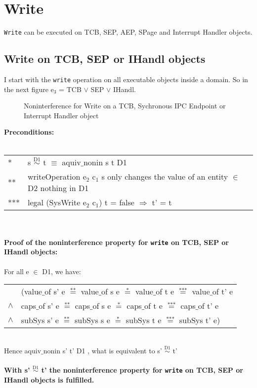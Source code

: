 \section{Write}\label{Write}
\texttt{Write} can be executed on TCB, SEP, AEP, SPage and Interrupt Handler objects.
\subsection{Write on TCB, SEP or IHandl objects}
I start with the \texttt{write} operation on all executable objects inside a domain. So in the next figure e$_3$ = TCB $\vee$ SEP $\vee$ IHandl.
\begin{figure}[H]
\caption{Noninterference for Write on a TCB, Sychronous IPC Endpoint or Interrupt Handler object}
\end{figure}
\textbf{Preconditions:} \\ \\
\begin{tabular}{ll}
* & s $\overset{\text{D1}}{\sim}$ t $\equiv$ aquiv$\_$nonin s t D1	\\ 
** & writeOperation e$_2$ c$_1$ s only changes the value of an entity $\in$ D2 nothing in D1 \\ 
*** & legal (SysWrite e$_2$ c$_1$) t = false $\Rightarrow$ t' = t
\end{tabular} \\ \\ 
\textbf{Proof of the noninterference property for \texttt{write} on TCB, SEP or IHandl objects:}\\ \\
For all e $\in$ D1, we have: \\ 
\begin{tabular}{ll}
& (value$\_$of s' e $\overset{\text{**}}{=}$ value$\_$of s e $\overset{\text{*}}{=}$ value$\_$of t e $\overset{\text{***}}{=}$ value$\_$of t' e \\
$\wedge$ & caps$\_$of s' e $\overset{\text{**}}{=}$ caps$\_$of s e $\overset{\text{*}}{=}$ caps$\_$of t e $\overset{\text{***}}{=}$ caps$\_$of t' e \\
$\wedge$ & subSys s' e $\overset{\text{**}}{=}$ subSys s e $\overset{\text{*}}{=}$ subSys t e $\overset{\text{***}}{=}$ subSys t' e)
\end{tabular} \\
Hence aquiv$\_$nonin s' t' D1 , what is equivalent to s' $\overset{\text{D1}}{\sim}$ t' \\ \\ 
\textbf{With s' $\overset{\text{D1}}{\sim}$ t' the noninterference property for \texttt{write} on TCB, SEP or IHandl objects is fulfilled.} 
